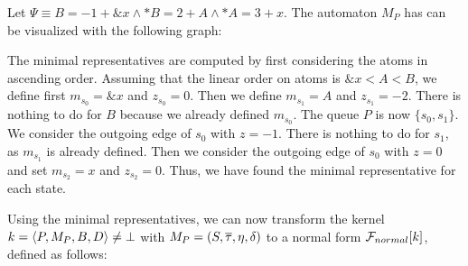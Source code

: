 \begin{example}\label{ex:min-repr}
    Let $\Psi \equiv B = -1 + \&x \land *B = 2 + A \land *A = 3 + x$.
    The automaton $M_P$ has can be visualized with the following graph:
    \begin{center}
    \end{center}

    The minimal representatives are computed by first considering the atoms in ascending order.
    Assuming that the linear order on atoms is $\&x < A < B$,
    we define first $m_{s_0} = \&x$ and $z_{s_0} = 0$.
    Then we define $m_{s_1} = A$ and $z_{s_1} = -2$.
    There is nothing to do for $B$ because we already defined $m_{s_0}$.
    The queue $P$ is now $\{s_0, s_1\}$.
    We consider the outgoing edge of $s_0$ with $z = -1$.
    There is nothing to do for $s_1$, as $m_{s_1}$ is already defined.
    Then we consider the outgoing edge of $s_0$ with $z = 0$
    and set $m_{s_2} = x$ and $z_{s_2} = 0$.
    Thus, we have found the minimal representative for each state.
\end{example}
Using the minimal representatives, we can now transform the kernel $k = \langle P,M_P,B,D\rangle \neq \bot$ with $M_P = (S, \overline{\tau}, \eta, \delta)$ to a normal form $\mathcal{F}_{normal}[k]$,
defined as follows:

